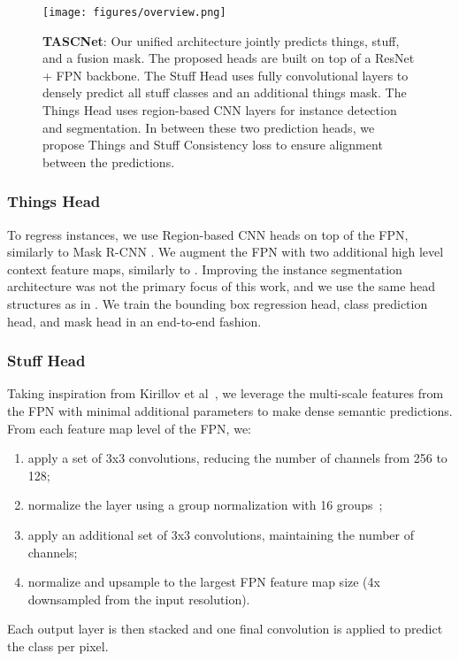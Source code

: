 \documentclass[10pt,twocolumn]{article}
\begin{document}
\begin{figure*}[!]
    \centering
    \texttt{[image: figures/overview.png]}
    \caption{\textbf{TASCNet}: Our unified architecture jointly predicts things, stuff, and a fusion mask. The proposed heads are built on top of a ResNet + FPN backbone. The Stuff Head uses fully convolutional layers to densely predict all stuff classes and an additional things mask. The Things Head uses region-based CNN layers for instance detection and segmentation. In between these two prediction heads, we propose Things and Stuff Consistency loss to ensure alignment between the predictions.}
    \label{fig:joint-network}
\end{figure*}




\subsubsection{Things Head}
To regress instances, we use Region-based CNN heads on top of the \ac{FPN}, similarly to Mask R-CNN \cite{he2017mask}. We augment the \ac{FPN} with two additional high level context feature maps, similarly to \cite{retinanet}. Improving the instance segmentation architecture was not the primary focus of this work, and we use the same head structures as in \cite{he2017mask}. We train the bounding box regression head, class prediction head, and mask head in an end-to-end fashion.
\subsubsection{Stuff Head\label{subsec:stuff-head}}
Taking inspiration from Kirillov et al~\cite{coco_stuff_2017_fair}, we leverage the multi-scale features from the \ac{FPN} with minimal additional parameters to make dense semantic predictions. From each feature map level of the \ac{FPN}, we:
\begin{enumerate}
    \item apply a set of 3x3 convolutions, reducing the number of channels from 256 to 128;
    \item normalize the layer using a group normalization with 16 groups~\cite{groupnorm};
    \item apply an additional set of 3x3 convolutions, maintaining the number of channels;
    \item normalize and upsample to the largest FPN feature map size (4x downsampled from the input resolution).
\end{enumerate}
Each output layer is then stacked and one final convolution is applied to predict the class per pixel.
\end{document}
